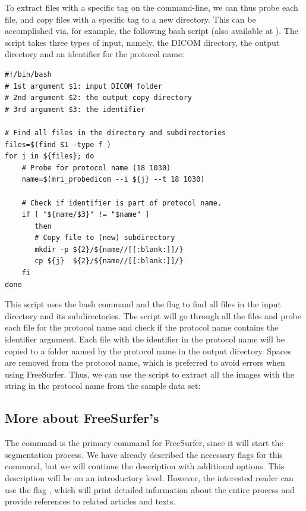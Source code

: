 To extract files with a specific tag on the command-line, we can thus
probe each file, and copy files with a specific tag to a new
directory. This can be accomplished via, for example, the following bash script
(also available at ). The script
takes three types of input, namely, the DICOM directory, the output directory and
an identifier for the protocol name:
\begin{lstlisting}[style=bashStyle]
#!/bin/bash
# 1st argument $1: input DICOM folder
# 2nd argument $2: the output copy directory
# 3rd argument $3: the identifier 

# Find all files in the directory and subdirectories
files=$(find $1 -type f ) 
for j in ${files}; do
    # Probe for protocol name (18 1030)
    name=$(mri_probedicom --i ${j} --t 18 1030) 

    # Check if identifier is part of protocol name.
    if [ "${name/$3}" != "$name" ]
       then
       # Copy file to (new) subdirectory 
       mkdir -p ${2}/${name//[[:blank:]]/}  
       cp ${j}  ${2}/${name//[[:blank:]]/} 
    fi
done
\end{lstlisting}

This script uses the bash command  and the flag  to find all files in the input directory and its
subdirectories. The script will go through all the files and probe
each file for the protocol name and check if the protocol name
contains the identifier argument. Each file with the identifier in the
protocol name will be copied to a folder named by the protocol name in
the output directory. Spaces are removed from the protocol name, which is preferred to avoid errors when using FreeSurfer.
Thus, we can use the script to extract all the images with the 
string in the protocol name from the sample data set:

\subsection{More about FreeSurfer's }
\label{sec:chp3:advanced:recon-all}
%
%
The command  is the primary command for FreeSurfer,
since it will start the segmentation process. We have already
described the necessary flags for this command, but we will continue
the description with additional options. This description will be
on an introductory level. However, the interested reader can use the
flag , which will print detailed information about the
entire process and provide references to related articles and texts.

